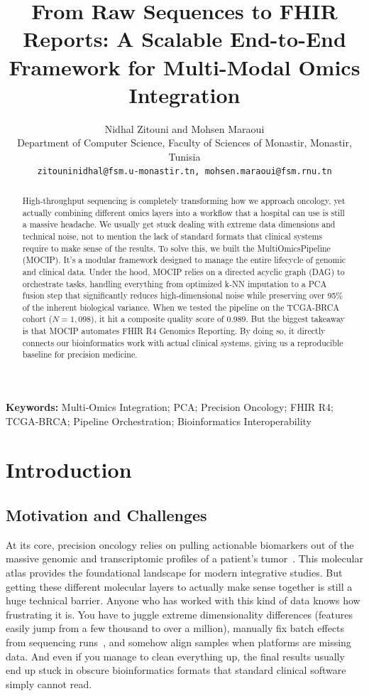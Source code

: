 \documentclass[12pt,a4paper,onecolumn]{article}
\title{From Raw Sequences to FHIR Reports: A Scalable End-to-End Framework for Multi-Modal Omics Integration}
\author{Nidhal Zitouni and Mohsen Maraoui \\
\small Department of Computer Science, Faculty of Sciences of Monastir, Monastir, Tunisia \\
\small \texttt{zitouninidhal@fsm.u-monastir.tn, mohsen.maraoui@fsm.rnu.tn}}
\date{}
\begin{document}
\maketitle


\begin{abstract}
High-throughput sequencing is completely transforming how we approach oncology, yet actually combining different omics layers into a workflow that a hospital can use is still a massive headache. We usually get stuck dealing with extreme data dimensions and technical noise, not to mention the lack of standard formats that clinical systems require to make sense of the results. To solve this, we built the MultiOmicsPipeline (MOCIP). It's a modular framework designed to manage the entire lifecycle of genomic and clinical data. Under the hood, MOCIP relies on a directed acyclic graph (DAG) to orchestrate tasks, handling everything from optimized k-NN imputation to a PCA fusion step that significantly reduces high-dimensional noise while preserving over 95\% of the inherent biological variance. When we tested the pipeline on the TCGA-BRCA cohort ($N=1,098$), it hit a composite quality score of 0.989. But the biggest takeaway is that MOCIP automates FHIR R4 Genomics Reporting. By doing so, it directly connects our bioinformatics work with actual clinical systems, giving us a reproducible baseline for precision medicine.
\end{abstract}

\noindent
\textbf{Keywords:} 
Multi-Omics Integration; PCA; Precision Oncology; FHIR R4; TCGA-BRCA; Pipeline Orchestration; Bioinformatics Interoperability


\section{Introduction}

\subsection{Motivation and Challenges}
At its core, precision oncology relies on pulling actionable biomarkers out of the massive genomic and transcriptomic profiles of a patient's tumor~\cite{tomczak2015}. This molecular atlas provides the foundational landscape for modern integrative studies. But getting these different molecular layers to actually make sense together is still a huge technical barrier. Anyone who has worked with this kind of data knows how frustrating it is. You have to juggle extreme dimensionality differences (features easily jump from a few thousand to over a million), manually fix batch effects from sequencing runs~\cite{leek2010}, and somehow align samples when platforms are missing data. And even if you manage to clean everything up, the final results usually end up stuck in obscure bioinformatics formats that standard clinical software simply cannot read.
\end{document}
